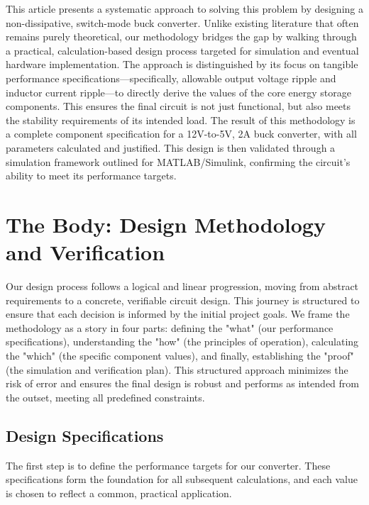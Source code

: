 \documentclass[12pt, a4paper]{article}
\begin{document}
This article presents a systematic approach to solving this problem by designing a non-dissipative, switch-mode buck converter. Unlike existing literature that often remains purely theoretical, our methodology bridges the gap by walking through a practical, calculation-based design process targeted for simulation and eventual hardware implementation. The approach is distinguished by its focus on tangible performance specifications—specifically, allowable output voltage ripple and inductor current ripple—to directly derive the values of the core energy storage components. This ensures the final circuit is not just functional, but also meets the stability requirements of its intended load. The result of this methodology is a complete component specification for a 12V-to-5V, 2A buck converter, with all parameters calculated and justified. This design is then validated through a simulation framework outlined for MATLAB/Simulink, confirming the circuit's ability to meet its performance targets.



\section{The Body: Design Methodology and Verification}

Our design process follows a logical and linear progression, moving from abstract requirements to a concrete, verifiable circuit design. This journey is structured to ensure that each decision is informed by the initial project goals. We frame the methodology as a story in four parts: defining the "what" (our performance specifications), understanding the "how" (the principles of operation), calculating the "which" (the specific component values), and finally, establishing the "proof" (the simulation and verification plan). This structured approach minimizes the risk of error and ensures the final design is robust and performs as intended from the outset, meeting all predefined constraints.



\subsection{Design Specifications}

The first step is to define the performance targets for our converter. These specifications form the foundation for all subsequent calculations, and each value is chosen to reflect a common, practical application.
\end{document}
